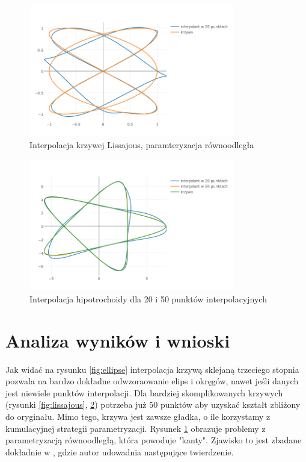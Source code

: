 \documentclass[11pt,wide]{mwart}
\begin{document}
\begin{figure}[h]
    \centering
    \includegraphics[width=0.8\textwidth]{equidistant}
    \caption{Interpolacja krzywej Lissajous, paramteryzacja równoodległa}
    \label{fig:equidistant}
\end{figure}

\begin{figure}[h]
    \centering
    \includegraphics[width=0.8\textwidth]{hypotrochoid}
    \caption{Interpolacja hipotrochoidy  dla 20 i 50 punktów interpolacyjnych}
    \label{fig:hypotrochoid}
\end{figure}

\section{Analiza wyników i wnioski}

Jak widać na rysunku \ref{fig:ellipse} interpolacja krzywą sklejaną trzeciego stopnia pozwala na bardzo dokładne odwzoraowanie elips i okręgów, nawet jeśli danych jest niewiele punktów interpolacji. Dla bardziej skomplikowanych krzywych (rysunki \ref{fig:lissajous}, \ref{fig:hypotrochoid}) potrzeba już $ 50 $ punktów aby uzyskać kształt zbliżony do oryginału. Mimo tego, krzywa jest zawsze gładka, o ile korzystamy z kumulacyjnej strategii parametryzacji. Rysunek \ref{fig:equidistant} obrazuje problemy z parametryzacją równoodległą, która powoduje "kanty". Zjawisko to jest zbadane dokładnie w \cite{epstein}, gdzie autor udowadnia następujące twierdzenie.
\end{document}
